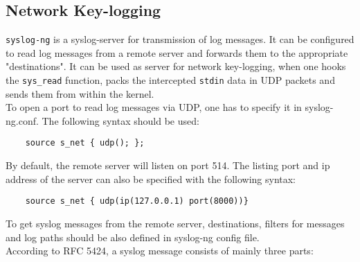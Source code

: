 \subsection{Network Key-logging}
\texttt{syslog-ng} is a syslog-server for transmission of log messages. It can be configured to read log messages from a remote server and forwards them to the appropriate "destinations". It can be used as server for network key-logging, when one hooks the \texttt{sys\_read} function, packs the intercepted \texttt{stdin} data in UDP packets and sends them from within the kernel.\\ 
To open a port to read log messages via UDP, one has to specify it in syslog-ng.conf. The following syntax should be used:
\begin{center}
\lstset{escapechar=,style=customc}
	\begin{lstlisting}
  	source s_net { udp(); };
	\end{lstlisting}
\end{center}
By default, the remote server will listen on port 514. The listing port and ip address of the server can also be specified with the following syntax:
\begin{center}
\lstset{escapechar=,style=customc}
	\begin{lstlisting}
  	source s_net { udp(ip(127.0.0.1) port(8000))}
	\end{lstlisting}
\end{center}
To get syslog messages from the remote server, destinations, filters for messages and log paths should be also defined in syslog-ng config file.\\
According to RFC 5424, a syslog message consists of mainly three parts:
